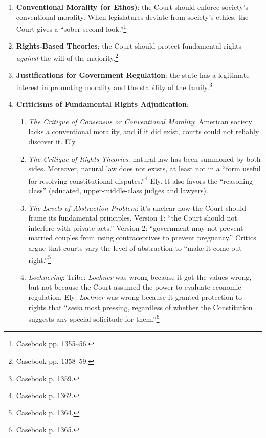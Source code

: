 \begin{enumerate}
    \item \textbf{Conventional Morality (or Ethos)}: the Court should enforce 
    society's conventional morality. When legislatures deviate from society's 
    ethics, the Court gives a ``sober second look.''\footnote{Casebook pp. 
    1355--56.}
    \item \textbf{Rights-Based Theories}: the Court should protect fundamental 
    rights \emph{against} the will of the majority.\footnote{Casebook pp. 
    1358--59.}
    \item \textbf{Justifications for Government Regulation}: the state has a 
    legitimate interest in promoting morality and the stability of the 
    family.\footnote{Casebook p. 1359.}
    \item \textbf{Criticisms of Fundamental Rights Adjudication}:
    \begin{enumerate}
        \item \emph{The Critique of Consensus or Conventional Morality}: 
        American society lacks a conventional morality, and if it did exist, 
        courts could not reliably discover it. Ely.
        \item \emph{The Critique of Rights Theories}: natural law has been 
        summoned by both sides. Moreover, natural law does not exists, at 
        least not in a ``form useful for resolving constitutional 
        disputes.''\footnote{Casebook p. 1362.} Ely. It also favors the 
        ``reasoning class'' (educated, upper-middle-class judges and lawyers).
        \item \emph{The Levels-of-Abstraction Problem}: it's unclear how the 
        Court should frame its fundamental principles. Version 1: ``the Court 
        should not interfere with private acts.'' Version 2: ``government may 
        not prevent married couples from using contraceptives to prevent 
        pregnancy.'' Critics argue that courts vary the level of abstraction 
        to ``make it come out right.''\footnote{Casebook p. 1364.}
        \item \emph{Lochnering}: Tribe: \emph{Lochner} was wrong because it 
        got the values wrong, but not because the Court assumed the power to 
        evaluate economic regulation. Ely: \emph{Lochner} was wrong because it 
        granted protection to rights that ``\emph{seem} most pressing, 
        regardless of whether the Constitution suggests any special solicitude 
        for them.''\footnote{Casebook p. 1365.}
    \end{enumerate}
\end{enumerate}

